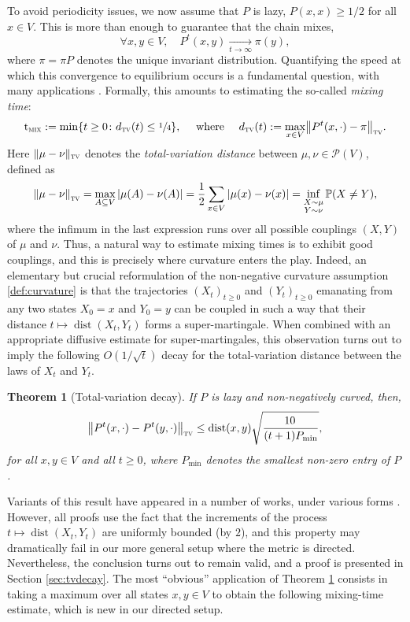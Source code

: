 \documentclass[10pt]{amsart}
\newtheorem{theorem}{Theorem}
\theoremstyle{definition}
\newcommand{\PP}{{\mathbb{P}}}
\newcommand{\cP}{\mathcal{P}}
\newcommand{\dtv}{d_{\textup{\textsc{tv}}}}
\newcommand{\tv}{\textup{\textsc{tv}}}
\newcommand{\tmix}{\mathrm{t}_{\textup{\textsc{mix}}}}
\newcommand{\pmin}{P_{\mathrm{min}}}
\DeclareMathOperator{\dist}{dist}
\begin{document}
To avoid periodicity issues, we now assume that $P$ is lazy, \ie $P(x,x)\ge 1/2$ for all $x\in V$. This is more than enough to guarantee that the chain mixes, \ie
\begin{equation*}
\forall x,y\in V,\quad P^t(x,y) \xrightarrow[t\to\infty]{} \pi(y),
\end{equation*}
where $\pi=\pi P$ denotes the unique invariant distribution. Quantifying the speed at which this convergence to equilibrium occurs is a fundamental question, with many applications \cite{MR3726904,MR2341319}. Formally, this amounts to estimating the so-called \emph{mixing time}:
\begin{equation*}
\tmix := \min\{t\ge 0\colon \dtv(t)\le \sfrac{1}{4}\}, \quad\textrm{ where }\quad \dtv(t) := \max_{x\in V}\bigl\|P^t(x,\cdot)-\pi\bigr\|_{\tv}.
\end{equation*}
Here $\|\mu-\nu\|_{\tv}$ denotes the \emph{total-variation distance} between $\mu,\nu\in\cP(V)$, defined as
\begin{equation*}
\left\|\mu-\nu\right\|_{\tv} = \max_{A\subseteq V}|\mu(A)-\nu(A)| =\frac{1}{2}\sum_{x\in V}|\mu(x)-\nu(x)| =\inf_{\substack{X\sim \mu\\Y\sim\nu}}\PP(X\ne Y),
\end{equation*}
where the infimum in the last expression runs over all possible couplings $(X,Y)$ of $\mu$ and $\nu$. Thus, a natural way to estimate mixing times is to exhibit good couplings, and this is precisely where curvature enters the play. Indeed, an elementary but crucial reformulation of the non-negative curvature assumption \eqref{def:curvature} is that the trajectories $(X_t)_{t\ge 0}$ and $(Y_t)_{t\ge 0}$ emanating from any two states $X_0=x$ and $Y_0=y$ can be coupled in such a way that their distance $t\mapsto \dist(X_t,Y_t)$ forms a super-martingale. When combined with an appropriate diffusive estimate for super-martingales, this observation turns out to imply the following $O(1/\sqrt{t})$ decay for the total-variation distance between the laws of $X_t$ and $Y_t$.
\begin{theorem}[Total-variation decay]\label{th:tvdecay}If $P$ is lazy and non-negatively curved, then,
\begin{equation*}
\left\|P^t(x,\cdot)-P^t(y,\cdot)\right\|_{\tv} \le \dist(x,y)\sqrt{\frac{10\,}{{(t+1)\pmin }}},
\end{equation*}
for all $x,y\in V$ and all $t\ge 0$, where $\pmin$ denotes the smallest non-zero entry of $P$.
\end{theorem}
Variants of this result have appeared in a number of works, under various forms \cite{MR2316551,lin2015equivalent,munch2019non,salez2021sparse}. However, all proofs use the fact that the increments of the process $t\mapsto \dist(X_t,Y_t)$ are uniformly bounded (by $2$), and this property may dramatically fail in our more general setup where the metric is directed. Nevertheless, the conclusion turns out to remain valid, and a proof is presented in Section \ref{sec:tvdecay}. The most ``obvious'' application of Theorem \ref{th:tvdecay} consists in taking a maximum over all states $x,y\in V$ to obtain the following mixing-time estimate, which is new in our directed setup.
\end{document}
